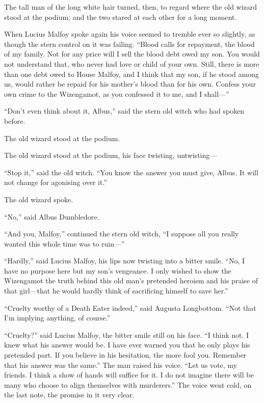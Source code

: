 The tall man of the long white hair turned, then, to regard where the
old wizard stood at the podium; and the two stared at each other for a
long moment.

When Lucius Malfoy spoke again his voice seemed to tremble ever so
slightly, as though the stern control on it was failing. ``Blood calls
for repayment, the blood of my family. Not for any price will I sell the
blood debt owed my son. You would not understand that, who never had
love or child of your own. Still, there is more than one debt owed to
House Malfoy, and I think that my son, if he stood among us, would
rather be repaid for his mother's blood than for his own. Confess your
own crime to the Wizengamot, as you confessed it to me, and I shall---''

``Don't even think about it, Albus,'' said the stern old witch who had
spoken before.

The old wizard stood at the podium.

The old wizard stood at the podium, his face twisting, untwisting---

``Stop it,'' said the old witch. ``You know the answer you must give,
Albus. It will not change for agonising over it.''

The old wizard spoke.

``No,'' said Albus Dumbledore.

``And you, Malfoy,'' continued the stern old witch, ``I suppose all you
really wanted this whole time was to ruin---''

``Hardly,'' said Lucius Malfoy, his lips now twisting into a bitter
smile. ``No, I have no purpose here but my son's vengeance. I only
wished to show the Wizengamot the truth behind this old man's pretended
heroism and his praise of that girl---that he would hardly think of
sacrificing himself to save her.''

``Cruelty worthy of a Death Eater indeed,'' said Augusta Longbottom.
``Not that I'm implying anything, of course.''

``Cruelty?'' said Lucius Malfoy, the bitter smile still on his face. ``I
think not. I knew what his answer would be. I have ever warned you that
he only plays his pretended part. If you believe in his hesitation, the
more fool you. Remember that his answer was the same.'' The man raised
his voice. ``Let us vote, my friends. I think a show of hands will
suffice for it. I do not imagine there will be many who choose to align
themselves with murderers.'' The voice went cold, on the last note, the
promise in it very clear.

